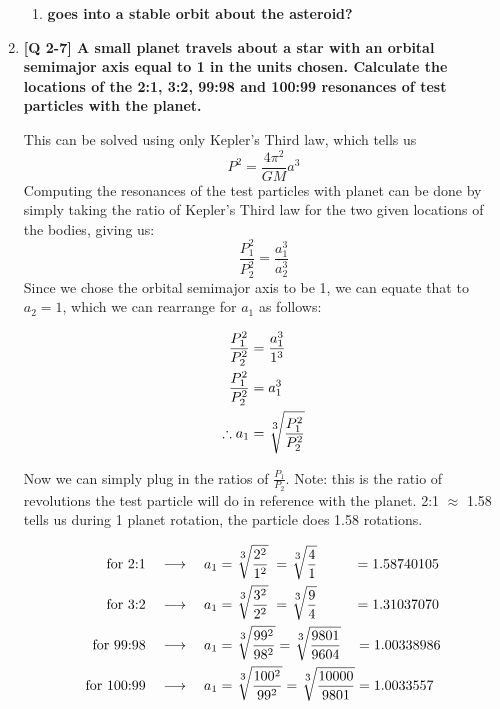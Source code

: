 \documentclass[10pt]{article}
\begin{document}
\begin{enumerate}
\begin{enumerate}
			\item  \textbf{goes into a stable orbit about the asteroid?}

		\end{enumerate}
		
		
		
		
		\newpage 
		\item  \textbf{ [Q 2-7] A small planet travels about a star with an orbital semimajor axis equal to 1 in the units chosen. Calculate the locations of the 2:1, 3:2, 99:98 and 100:99 resonances of test particles with the planet.}
		
		This can be solved using only Kepler's Third law, which tells us 
		\[P^2 = \frac{4\pi^2}{GM} a^3 \]
		Computing the resonances of the test particles with planet can be done by simply taking the ratio of Kepler's Third law for the two given locations of the bodies, giving us:
		\[ \frac{P_1^2}{P_2^2} = \frac{a_1^3}{a_2^3} \]
		Since we chose the orbital semimajor axis to be 1, we can equate that to $a_2 = 1$, which we can rearrange for $a_1$ as follows:
		
		\begin{align*}
			\frac{P_1^2}{P_2^2} &= \frac{a_1^3}{1^3} \\
			\frac{P_1^2}{P_2^2} &= a_1^3 \\
			\therefore a_1 &= \sqrt[\uproot{3}\scriptstyle 3]{\frac{P_1^2}{P_2^2}}
		\end{align*}
		
		Now we can simply plug in the ratios of $\displaystyle \frac{P_1}{P_2}$. Note: this is the ratio of revolutions the test particle will do in reference with the planet. 2:1 $\approx$ 1.58 tells us during 1 planet rotation, the particle does 1.58 rotations.
		
		\begin{align*}
			\text{for 2:1} \quad \longrightarrow \quad a_1 &= \sqrt[\uproot{3}\scriptstyle 3]{\frac{2^2}{1^2}} \; = \sqrt[\uproot{3}\scriptstyle 3]{\frac{4}{1}} \hspace{26px} = 1.58740105 \\ 
			\text{for 3:2} \quad \longrightarrow \quad a_1 &= \sqrt[\uproot{3}\scriptstyle 3]{\frac{3^2}{2^2}} \; = \sqrt[\uproot{3}\scriptstyle 3]{\frac{9}{4}} \hspace{26px} = 1.31037070 \\ 
			\text{for 99:98} \quad \longrightarrow \quad a_1 &= \sqrt[\uproot{3}\scriptstyle 3]{\frac{99^2}{98^2}} = \sqrt[\uproot{3}\scriptstyle 3]{\frac{9801}{9604}} \hspace{10px} = 1.00338986 \\ 
			\text{for 100:99} \quad \longrightarrow \quad a_1 &= \sqrt[\uproot{3}\scriptstyle 3]{\frac{100^2}{99^2}} = \sqrt[\uproot{3}\scriptstyle 3]{\frac{10000}{9801}} = 1.0033557\\ 
		\end{align*}
		

\end{enumerate}
\end{document}
